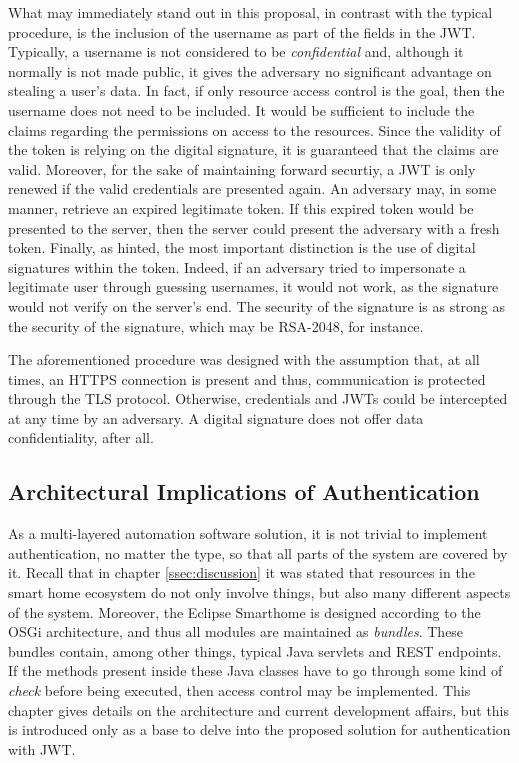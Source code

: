 \documentclass[12pt]{article}
\begin{document}
What may immediately stand out in this proposal, in contrast with the typical procedure, is the inclusion of the username as part of the fields in the JWT. Typically, a username is not considered to be \emph{confidential} and, although it normally is not made public, it gives the adversary no significant advantage on stealing a user's data. In fact, if only resource access control is the goal, then the username does not need to be included. It would be sufficient to include the claims regarding the permissions on access to the resources. Since the validity of the token is relying on the digital signature, it is guaranteed that the claims are valid. Moreover, for the sake of maintaining forward securtiy, a JWT is only renewed if the valid credentials are presented again. An adversary may, in some manner, retrieve an expired legitimate token. If this expired token would be presented to the server, then the server could present the adversary with a fresh token. Finally, as hinted, the most important distinction is the use of digital signatures within the token. Indeed, if an adversary tried to impersonate a legitimate user through guessing usernames, it would not work, as the signature would not verify on the server's end. The security of the signature is as strong as the security of the signature, which may be RSA-2048, for instance. 

The aforementioned procedure was designed with the assumption that, at all times, an HTTPS connection is present and thus, communication is protected through the TLS protocol. Otherwise, credentials and JWTs could be intercepted at any time by an adversary. A digital signature does not offer data confidentiality, after all.

\subsection{Architectural Implications of Authentication}

As a multi-layered automation software solution, it is not trivial to implement authentication, no matter the type, so that all parts of the system are covered by it. Recall that in chapter \ref{ssec:discussion} it was stated that resources in the smart home ecosystem do not only involve things, but also many different aspects of the system. Moreover, the Eclipse Smarthome is designed according to the OSGi architecture, and thus all modules are maintained as \emph{bundles}. These bundles contain, among other things, typical Java servlets and REST endpoints. If the methods present inside these Java classes have to go through some kind of \emph{check} before being executed, then access control may be implemented. This chapter gives details on the architecture and current development affairs, but this is introduced only as a base to delve into the proposed solution for authentication with JWT.
\end{document}
